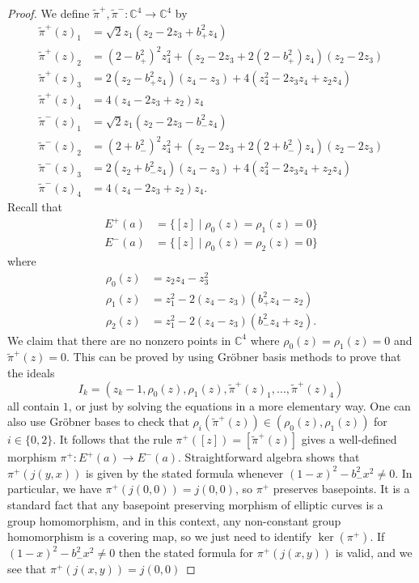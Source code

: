 \documentclass[reqno]{amsart}
\newcommand{\C}         {{\mathbb{C}}}
\newcommand{\st}        {\;|\;}
\newcommand{\rt}        {\sqrt{2}}
\newcommand{\tpi}	{\widetilde{\pi}}
\renewcommand{\:}{\colon}
\theoremstyle{definition}
\begin{document}
\begin{proof}
 We define $\tpi^+,\tpi^-\:\C^4\to\C^4$ by
 \begin{align*}
  \tpi^+(z)_1 &= \rt z_1(z_2-2z_3+b_+^2z_4) \\
  \tpi^+(z)_2 &= (2-b_+^2)^2z_4^2 +(z_2-2z_3+2(2-b_+^2)z_4)(z_2-2z_3) \\
  \tpi^+(z)_3 &= 2(z_2-b_+^2z_4)(z_4-z_3)+4(z_4^2-2z_3z_4+z_2z_4) \\
  \tpi^+(z)_4 &= 4(z_4-2z_3+z_2)z_4 \\
  \tpi^-(z)_1 &= \rt z_1(z_2-2z_3-b_-^2z_4) \\
  \tpi^-(z)_2 &= (2+b_-^2)^2z_4^2 +(z_2-2z_3+2(2+b_-^2)z_4)(z_2-2z_3) \\
  \tpi^-(z)_3 &= 2(z_2+b_-^2z_4)(z_4-z_3)+4(z_4^2-2z_3z_4+z_2z_4) \\
  \tpi^-(z)_4 &= 4(z_4-2z_3+z_2)z_4.
 \end{align*}
 Recall that
 \begin{align*}
  E^+(a) &= \{[z]\st \rho_0(z)=\rho_1(z)=0\} \\
  E^-(a) &= \{[z]\st \rho_0(z)=\rho_2(z)=0\}
 \end{align*}
 where
 \begin{align*}
  \rho_0(z) &= z_2z_4-z_3^2 \\
  \rho_1(z) &= z_1^2 - 2(z_4-z_3)(b_+^2z_4-z_2) \\
  \rho_2(z) &= z_1^2 - 2(z_4-z_3)(b_-^2z_4+z_2).
 \end{align*}
 We claim that there are no nonzero points in $\C^4$ where
 $\rho_0(z)=\rho_1(z)=0$ and $\tpi^+(z)=0$.  This can be proved by
 using Gr\"obner basis methods to prove that the ideals
 \[ I_k = (z_k-1,\rho_0(z),\rho_1(z),\tpi^+(z)_1,\dotsc,\tpi^+(z)_4) \]
 all contain $1$, or just by solving the equations in a more
 elementary way.  One can also use Gr\"obner bases to check that
 $\rho_i(\tpi^+(z))\in(\rho_0(z),\rho_1(z))$ for $i\in\{0,2\}$.  It
 follows that the rule $\pi^+([z])=[\tpi^+(z)]$ gives a well-defined
 morphism $\pi^+\:E^+(a)\to E^-(a)$.  Straightforward algebra shows
 that $\pi^+(j(y,x))$ is given by the stated formula whenever
 $(1-x)^2-b_-^2x^2\neq 0$.  In particular, we have
 $\pi^+(j(0,0))=j(0,0)$, so $\pi^+$ preserves basepoints.  It is a
 standard fact that any basepoint preserving morphism of elliptic
 curves is a group homomorphism, and in this context, any non-constant
 group homomorphism is a covering map, so we just need to identify
 $\ker(\pi^+)$.  If $(1-x)^2-b_-^2x^2\neq 0$ then the stated formula
 for $\pi^+(j(x,y))$ is valid, and we see that $\pi^+(j(x,y))=j(0,0)$

\end{proof}
\end{document}
